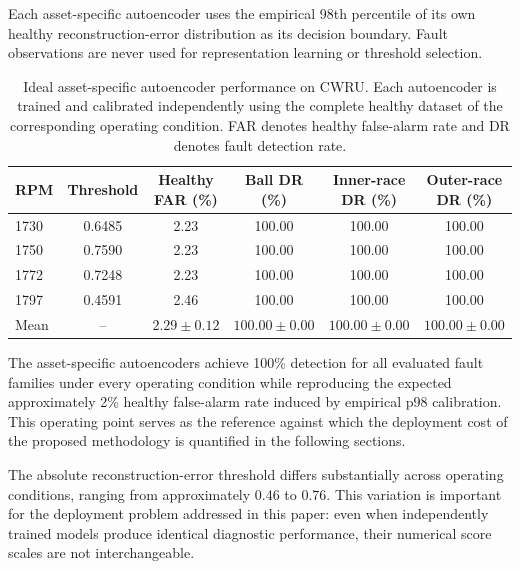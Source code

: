 \documentclass{trbunofficial}
\begin{document}
Each asset-specific autoencoder uses the empirical 98th percentile of its
own healthy reconstruction-error distribution as its decision boundary.
Fault observations are never used for representation learning or threshold
selection.

\begin{table}[!ht]
\centering
\caption{Ideal asset-specific autoencoder performance on CWRU. Each 
autoencoder is trained and calibrated independently using the complete
healthy dataset of the corresponding operating condition. FAR denotes 
healthy false-alarm rate and DR denotes fault detection rate.}
\label{tab:asset-specific-by-condition}

\begin{tabular}{lccccc}
\toprule
RPM &
Threshold &
Healthy FAR (\%) &
Ball DR (\%) &
Inner-race DR (\%) &
Outer-race DR (\%)\\
\midrule

1730 &
0.6485 &
2.23 &
100.00 &
100.00 &
100.00 \\

1750 &
0.7590 &
2.23 &
100.00 &
100.00 &
100.00 \\

1772 &
0.7248 &
2.23 &
100.00 &
100.00 &
100.00 \\

1797 &
0.4591 &
2.46 &
100.00 &
100.00 &
100.00 \\

\midrule

Mean &
-- &
$2.29 \pm 0.12$ &
$100.00 \pm 0.00$ &
$100.00 \pm 0.00$ &
$100.00 \pm 0.00$ \\

\bottomrule
\end{tabular}
\end{table}

The asset-specific autoencoders achieve 100\% detection for all evaluated
fault families under every operating condition while reproducing the
expected approximately 2\% healthy false-alarm rate induced by empirical
p98 calibration. This operating point serves as the reference against which
the deployment cost of the proposed methodology is quantified in the
following sections.

The absolute reconstruction-error threshold differs substantially across
operating conditions, ranging from approximately 0.46 to 0.76. This
variation is important for the deployment problem addressed in this paper:
even when independently trained models produce identical diagnostic
performance, their numerical score scales are not interchangeable.
\end{document}

